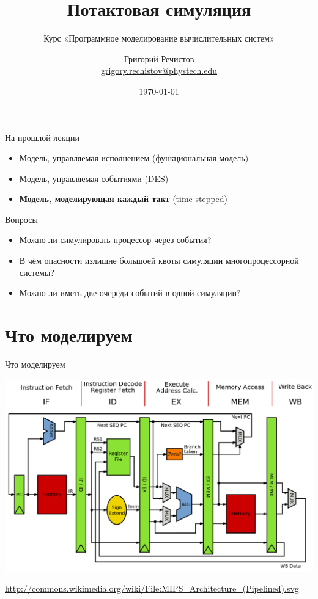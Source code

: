 \documentclass{beamer}
\title{Потактовая симуляция}
\subtitle{Курс «Программное моделирование вычислительных систем»}
\author[]{Григорий Речистов \\ \small{\href{mailto:grigory.rechistov@phystech.edu}{grigory.rechistov@phystech.edu}}}
\date{\today}
\begin{document}
\begin{frame}
    \maketitle
\end{frame}

\begin{frame}
    \tableofcontents
\end{frame}

\begin{frame}{На прошлой лекции}
\begin{itemize}
    \item Модель, управляемая исполнением (функциональная модель)
    \item Модель, управляемая событиями (DES)\pause
    \item \textbf{Модель, моделирующая каждый такт} (time-stepped)
\end{itemize}
\end{frame}

\begin{frame}{Вопросы}
\begin{itemize}
\item Можно ли симулировать процессор через события?\pause
\item В чём опасности излишне большоей квоты симуляции многопроцессорной системы?\pause
\item Можно ли иметь две очереди событий в одной симуляции?
\end{itemize}

\end{frame}

\section{Что моделируем}

\begin{frame}{Что моделируем}
\centering

\includegraphics[width=\textwidth]{./mips-arch}

\tiny{\url{http://commons.wikimedia.org/wiki/File:MIPS_Architecture_(Pipelined).svg}}
\end{frame}
\end{document}
